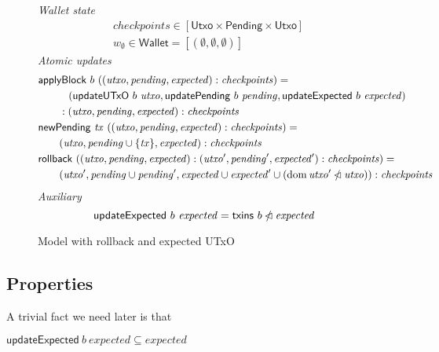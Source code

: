 \documentclass{article}
\newcommand{\restrictdom}{\lhd}
\newcommand{\subtractdom}{\mathbin{\slashed{\restrictdom}}}
\DeclareMathOperator{\dom}{dom}
\theoremstyle{definition}{
  \newtheorem{lemma}{Lemma}[section] %
  \newtheorem{definition}[lemma]{Definition}
}
\theoremstyle{theorem}{
  \newtheorem{invariant}[lemma]{Invariant}
  \newtheorem{proofobligation}[lemma]{Proof Obligation}
}
\numberwithin{equation}{lemma}
\begin{document}
\begin{figure}
%
\emph{Wallet state}
%
\begin{align*}
& \mathit{checkpoints} \in [\mathsf{Utxo} \times \mathsf{Pending} \times \mathsf{Utxo}] \\
& w_\emptyset \in \mathsf{Wallet} = [(\emptyset, \emptyset, \emptyset)]
\end{align*}
%
\emph{Atomic updates}
%
\begin{align*}
& \mathsf{applyBlock} ~ b ~ ((\mathit{utxo}, \mathit{pending}, \mathit{expected}) : \mathit{checkpoints}) = \\
& \qquad \phantom{:{}} ~ (\mathsf{updateUTxO} ~ b ~ \mathit{utxo}, \mathsf{updatePending} ~ b ~ \mathit{pending}, \mathsf{updateExpected} ~ b ~ \mathit{expected}) \\
& \qquad : (\mathit{utxo}, \mathit{pending}, \mathit{expected}) : \mathit{checkpoints} \\
& \mathsf{newPending} ~ \mathit{tx} ~ ((\mathit{utxo}, \mathit{pending}, \mathit{expected}) : \mathit{checkpoints}) = \\
& \qquad (\mathit{utxo}, \mathit{pending} \cup \{\mathit{tx}\}, \mathit{expected}) : \mathit{checkpoints} \\
& \mathsf{rollback} ~ ((\mathit{utxo}, \mathit{pending}, \mathit{expected}) : (\mathit{utxo}', \mathit{pending}', \mathit{expected}') : \mathit{checkpoints}) = \\
& \qquad (\mathit{utxo}', \mathit{pending} \cup \mathit{pending}', \mathit{expected} \cup \mathit{expected}' \cup (\dom \mathit{utxo}' \subtractdom \mathit{utxo})) : \mathit{checkpoints} \\
\end{align*}
%
\emph{Auxiliary}
%
\begin{equation*}
\mathsf{updateExpected} ~ b ~ \mathit{expected} = \mathsf{txins} ~ b \subtractdom \mathit{expected}
\end{equation*}
%
\caption{\label{fig:model_with_expected_UTxO}Model with rollback and expected UTxO}
\end{figure}

\subsection{Properties}

A trivial fact we need later is that
%
\begin{lemma} \label{lem:updateExpected_is_filter}
\begin{math}
\mathsf{updateExpected} ~ b ~ \mathit{expected} \subseteq \mathit{expected}
\end{math}
\end{lemma}
\end{document}

